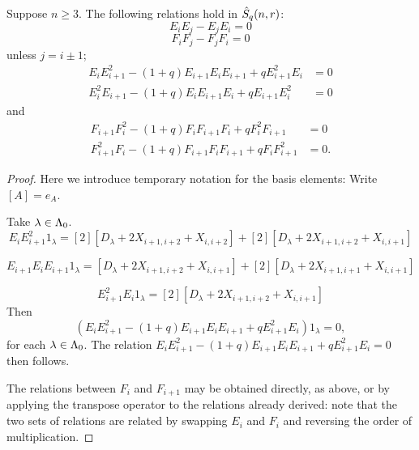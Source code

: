 \documentclass[a4paper, 11pt]{report}
\begin{document}
\begin{lemma}
Suppose $n\geq 3$. The following relations hold in $\hat{S}_q(n,r)$:
\begin{equation*}
E_i E_j - E_j E_i = 0
\end{equation*}
\begin{equation*}
F_i F_j - F_j F_i = 0
\end{equation*}
unless $j=i\pm 1$;
\begin{align*}
E_i E_{i+1}^2 - (1+q)E_{i+1} E_i E_{i+1} + qE_{i+1}^2 E_i &= 0\\
E_i^2 E_{i+1} - (1+q)E_i E_{i+1} E_i + qE_{i+1} E_i^2 &= 0
\end{align*}
and
\begin{align*}
F_{i+1} F_i^2 - (1+q) F_i F_{i+1} F_i + qF_i^2 F_{i+1} &=0\\
F_{i+1}^2 F_i - (1+q) F_{i+1} F_i F_{i+1} + q F_i F_{i+1}^2 &= 0.
\end{align*}
\end{lemma}
\begin{proof}
Here we introduce temporary notation for the basis elements: Write $[ A] = e_A$.

Take $\lambda\in{\Lambda_0}$.
\begin{equation*}
E_i E_{i+1}^2 1_\lambda = [2][ {D_\lambda + 2X_{i+1,i+2} + X_{i,i+2} }] + [2][ { D_\lambda + 2X_{i+1,i+2} + X_{i,i+1} }]
\end{equation*}                                                                                                                                                                                                                                                                                                                                      

\begin{equation*}
E_{i+1} E_i E_{i+1} 1_\lambda = [ {D_\lambda + 2X_{i+1,i+2} + X_{i,i+1} } ] + [2][ { D_\lambda + 2X_{i+1,i+1} + X_{i,i+1} } ]
\end{equation*}

\begin{equation*}
E_{i+1}^2 E_i 1_\lambda = [2][ { D_\lambda + 2X_{i+1,i+2} + X_{i,i+1} } ]
\end{equation*}
Then
\begin{equation*}
(E_i E_{i+1}^2 - (1+q)E_{i+1} E_i E_{i+1} + qE_{i+1}^2 E_i)1_\lambda = 0,
\end{equation*}
for each $\lambda\in{\Lambda_0}$. The relation $E_i E_{i+1}^2 - (1+q)E_{i+1} E_i E_{i+1} + qE_{i+1}^2 E_i = 0$ then follows.


The relations between $F_i$ and $F_{i+1}$ may be obtained directly, as above, or by applying the transpose operator to the relations already derived: note that the two sets of relations are related by swapping $E_i$ and $F_i$ and reversing the order of multiplication.
\end{proof}
\end{document}
